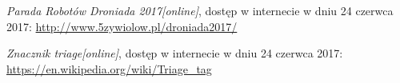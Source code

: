 \begin{thebibliography}{99}
 \emph{Parada Robotów Droniada 2017[online]}, dostęp w internecie w dniu 24 czerwca 2017:
 \url{http://www.5zywiolow.pl/droniada2017/}
 
 \emph{Znacznik triage[online]}, dostęp w internecie w dniu 24 czerwca 2017:
 \url{https://en.wikipedia.org/wiki/Triage_tag}

\end{thebibliography}
